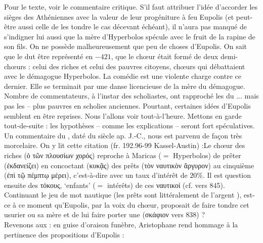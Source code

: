 {Pour le texte, voir le commentaire critique.
S'il faut attribuer l'idée d'accorder les sièges des Athéniennes avec la valeur de leur progéniture à feu Eupolis (et peut-être aussi celle de les tondre le cas décevant échéant), il n'aura pas manqué de s'indigner lui aussi que la mère d'Hyperbolos spécule avec le fruit de la rapine de son fils. 
On ne possède malheureusement que peu de choses d'Eupolis. On sait que le  dut être représenté en $-421$, que le chœur était formé de deux demi-chœurs : celui des riches et celui des pauvres citoyens, chœurs qui débattaient avec le démagogue Hyperbolos.
La comédie est une violente charge contre ce dernier.
Elle se terminait par une danse licencieuse de la mère du démagogue.
Nombre de commentateurs, à l'instar des scholiastes, ont rapproché les  du ... mais pas les  -- plus pauvres en scholies anciennes.
Pourtant, certaines idées d'Eupolis semblent en être reprises. Nous l'allons voir tout-à-l'heure.
Mettons en garde tout-de-suite : les hypothèses -- comme les explications -- seront fort spéculatives.\\
Un commentaire du , daté du  siècle ap. J.-C., nous est parvenu de façon très morcelaire. On y lit cette citation (fr. 192.96-99 Kassel-Austin) :\citComm{τοῦτ᾽ ἐκδανείζει καὶ κυκᾷς [τὸ]\douteux{ν} ναυτικὸν \douteux{ἄ}[ργυρον \ \ \ \ \ (\textbf{ἄργυρον} Bibi)\\
ἐπὶ τῷ πέμπτῳ μέρε[ι \ \ \ \ \ \ \ ]τοὺς τόκ[ους οἱ\\
ναυτικοί, ἡμεῖς δ᾽ ἄρ᾽ οἴκ[ \ \ \ \ \ \ \ \ \ \ \ ]εν· ὁ τῶν\\
πλουσίων λέγει χορός.}Le chœur des riches (ὁ τῶν πλουσίων χορός) reproche à Maricas ($=$ Hyperbolos) de prêter (ἐκδανείζει) en concoctant (κυκᾷς) des prêts (τὸν ναυτικὸν ἄργυρον) au cinquième (ἐπὶ τῷ πέμπτῳ μέρει), c'est-à-dire avec un taux d'intérêt de $20 \%$.
Il est question ensuite des τόκους, `enfants' ($=$ intérêts) de ces ναυτικοί (cf. vers 845).
Continuant le jeu de mot nautique (les prêts sont littéralement de l'argent ), est-ce à ce moment qu'Eupolis, par la voix du chœur, proposait de faire tondre  cet usurier ou sa mère et de lui faire porter une  (σκάφιον vers 838) ?\\
Revenons aux  : en guise d'oraison funèbre, Aristophane rend hommage à la pertinence des propositions d'Eupolis :}

